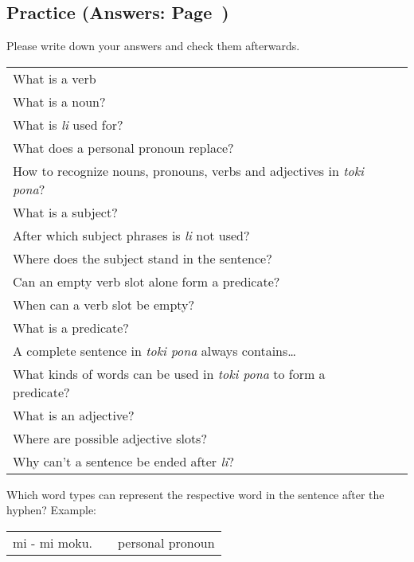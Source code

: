 \subsection*{Practice (Answers: Page~\pageref{'basic_sentences'})}
%
Please write down your answers and check them afterwards. 

\begin{supertabular}{p{5,5cm}|ll}
What is a verb &&  \\ %
What is a noun? &&   \\ %
What is \textit{li} used for?  &&   \\ %
What does a personal pronoun replace? &&  \\ %
How to recognize nouns, pronouns, verbs and adjectives in \textit{toki pona}? &&  \\ %
What is a subject?  &&   \\ %
After which subject phrases is \textit{li} not used?  &&  \\ %
Where does the subject stand in the sentence?  &&    \\ %
Can an empty verb slot alone form a predicate? &&    \\ %
When can a verb slot be empty?  &&     \\ %
What is a predicate?  &&     \\ %
A complete sentence in \textit{toki pona} always contains\dots  &&     \\ %
What kinds of words can be used in \textit{toki pona} to form a predicate? &&   \\ %
What is an adjective?  &&    \\ %
Where are possible adjective slots?  &&    \\  %
Why can't a sentence be ended after \textit{li}? &&  \\ %
\end{supertabular} 

Which word types can represent the respective word in the sentence after the hyphen?
Example:

\begin{supertabular}{p{5,5cm}|ll}
mi - mi moku. && personal pronoun \\ %
\end{supertabular}

